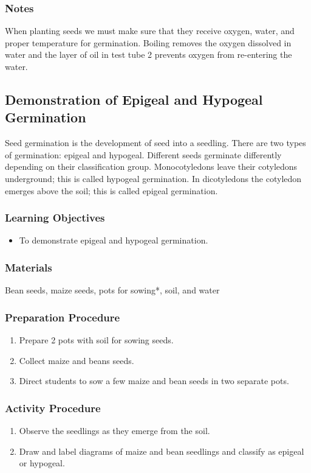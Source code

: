 \subsubsection*{Notes}
When planting seeds we must make sure that they receive oxygen, water, and proper temperature for germination. Boiling removes the oxygen dissolved in water and the layer of oil in test tube 2 prevents oxygen from re-entering the water.

\subsection{Demonstration of Epigeal and Hypogeal Germination}
Seed germination is the development of seed into a seedling. There are two types of germination: epigeal and hypogeal. Different seeds germinate differently depending on their classification group. Monocotyledons leave their cotyledons underground; this is called hypogeal germination. In dicotyledons the cotyledon emerges above the soil; this is called epigeal germination.

\subsubsection*{Learning Objectives}
\begin{itemize}
\item{To demonstrate epigeal and hypogeal germination.}
\end{itemize}

\subsubsection*{Materials}
Bean seeds, maize seeds, pots for sowing*, soil, and water

\subsubsection*{Preparation Procedure}
\begin{enumerate}
\item{Prepare 2 pots with soil for sowing seeds.}
\item{Collect maize and beans seeds.}
\item{Direct students to sow a few maize and bean seeds in two separate pots.}
\end{enumerate}

\subsubsection*{Activity Procedure}
\begin{enumerate}
\item{Observe the seedlings as they emerge from the soil.}
\item{Draw and label diagrams of maize and bean seedlings and classify as epigeal or hypogeal.}
\end{enumerate}


